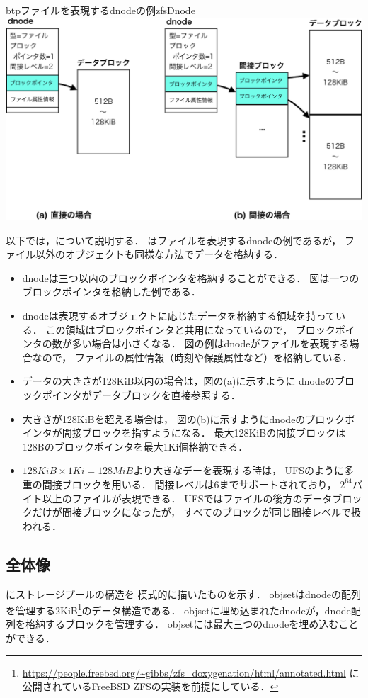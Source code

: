 \begin{myfig}{btp}{ファイルを表現するdnodeの例}{zfsDnode}
  \centering\includegraphics[scale=0.7]{Fig/zfsDnode-crop.pdf}
\end{myfig}

以下では，について説明する．
はファイルを表現するdnodeの例であるが，
ファイル以外のオブジェクトも同様な方法でデータを格納する．

\begin{itemize}
\item dnodeは三つ以内のブロックポインタを格納することができる．
  図は一つのブロックポインタを格納した例である．
\item dnodeは表現するオブジェクトに応じたデータを格納する領域を持っている．
  この領域はブロックポインタと共用になっているので，
  ブロックポインタの数が多い場合は小さくなる．
  図の例はdnodeがファイルを表現する場合なので，
  ファイルの属性情報（時刻や保護属性など）を格納している．
\item データの大きさが128KiB以内の場合は，図の(a)に示すように
  dnodeのブロックポインタがデータブロックを直接参照する．
\item 大きさが128KiBを超える場合は，
  図の(b)に示すようにdnodeのブロックポインタが間接ブロックを指すようになる．
  最大128KiBの間接ブロックは128Bのブロックポインタを最大1Ki個格納できる．
\item $128KiB \times 1Ki = 128MiB$より大きなデーを表現する時は，
  UFSのように多重の間接ブロックを用いる．
  間接レベルは6までサポートされており，
  $2^{64}$バイト以上のファイルが表現できる．
  UFSではファイルの後方のデータブロックだけが間接ブロックになったが，
  すべてのブロックが同じ間接レベルで扱われる．
\end{itemize}

\subsection{全体像}
にストレージプールの構造を
模式的に描いたものを示す．
objsetはdnodeの配列を管理する2KiB\footnote{
\url{https://people.freebsd.org/~gibbs/zfs_doxygenation/html/annotated.html}
に公開されているFreeBSD ZFSの実装を前提にしている．
}のデータ構造である．
objsetに埋め込まれたdnodeが，dnode配列を格納するブロックを管理する．
objsetには最大三つのdnodeを埋め込むことができる．

